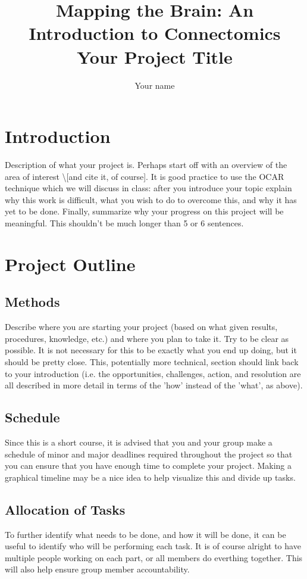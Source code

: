 \documentclass[11pt]{article} %
\title{Mapping the Brain: An Introduction to Connectomics\\Your Project Title}
\author{Your name}
\begin{document}
\maketitle

\section{Introduction}

Description of what your project is. Perhaps start off with an overview of the area of interest \textbackslash [and cite it, of course]. It is good practice to use the OCAR \cite{noel2013} technique which we will discuss in class: after you introduce your topic explain why this work is difficult, what you wish to do to overcome this, and why it has yet to be done. Finally, summarize why your progress on this project will be meaningful. This shouldn't be much longer than 5 or 6 sentences.

\section{Project Outline}
\subsection{Methods}
Describe where you are starting your project (based on what given results, procedures, knowledge, etc.) and where you plan to take it. Try to be clear as possible. It is not necessary for this to be exactly what you end up doing, but it should be pretty close. This, potentially more technical, section should link back to your introduction (i.e. the opportunities, challenges, action, and resolution are all described in more detail in terms of the 'how' instead of the 'what', as above).
\subsection{Schedule}
Since this is a short course, it is advised that you and your group make a schedule of minor and major deadlines required throughout the project so that you can ensure that you have enough time to complete your project. Making a graphical timeline may be a nice idea to help visualize this and divide up tasks. 
\subsection{Allocation of Tasks}
To further identify what needs to be done, and how it will be done, it can be useful to identify who will be performing each task. It is of course alright to have multiple people working on each part, or all members do everthing together. This will also help ensure group member accountability.
{}

\end{document}
